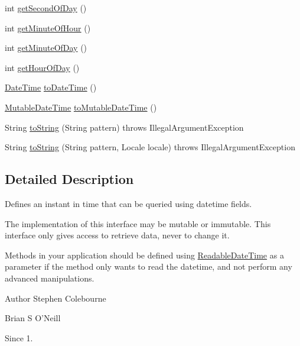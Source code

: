 \begin{DoxyCompactItemize}
\item 
int \hyperlink{interfaceorg_1_1joda_1_1time_1_1_readable_date_time_ad90213d900375b745a9f39bc9ab16078}{get\-Second\-Of\-Day} ()
\item 
int \hyperlink{interfaceorg_1_1joda_1_1time_1_1_readable_date_time_abaf87dd42025c9dbfd661ee05fd75529}{get\-Minute\-Of\-Hour} ()
\item 
int \hyperlink{interfaceorg_1_1joda_1_1time_1_1_readable_date_time_aecbd6243e91624f5995b320922cc61ca}{get\-Minute\-Of\-Day} ()
\item 
int \hyperlink{interfaceorg_1_1joda_1_1time_1_1_readable_date_time_a934d3c7576e35384e1e80610d275e937}{get\-Hour\-Of\-Day} ()
\item 
\hyperlink{classorg_1_1joda_1_1time_1_1_date_time}{Date\-Time} \hyperlink{interfaceorg_1_1joda_1_1time_1_1_readable_date_time_a3e4bb50229e61cc9370fa59b600330f0}{to\-Date\-Time} ()
\item 
\hyperlink{classorg_1_1joda_1_1time_1_1_mutable_date_time}{Mutable\-Date\-Time} \hyperlink{interfaceorg_1_1joda_1_1time_1_1_readable_date_time_a5efb7bab30e1d71b281cd72c747815bb}{to\-Mutable\-Date\-Time} ()
\item 
String \hyperlink{interfaceorg_1_1joda_1_1time_1_1_readable_date_time_aaf2860536cf34b1fc24f659e1e10f02c}{to\-String} (String pattern)  throws Illegal\-Argument\-Exception
\item 
String \hyperlink{interfaceorg_1_1joda_1_1time_1_1_readable_date_time_acd376c7b0dea79685afac745249b0bce}{to\-String} (String pattern, Locale locale)  throws Illegal\-Argument\-Exception
\end{DoxyCompactItemize}


\subsection{Detailed Description}
Defines an instant in time that can be queried using datetime fields. 

The implementation of this interface may be mutable or immutable. This interface only gives access to retrieve data, never to change it. 

Methods in your application should be defined using {\ttfamily \hyperlink{interfaceorg_1_1joda_1_1time_1_1_readable_date_time}{Readable\-Date\-Time}} as a parameter if the method only wants to read the datetime, and not perform any advanced manipulations.

\begin{DoxyAuthor}{Author}
Stephen Colebourne 

Brian S O'Neill 
\end{DoxyAuthor}
\begin{DoxySince}{Since}
1. 
\end{DoxySince}


